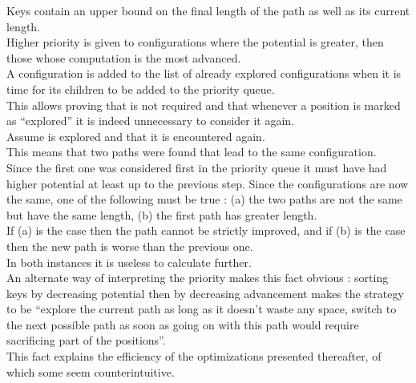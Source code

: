 Keys contain an upper bound on the final length of the path as well as its
current length.\\
Higher priority is given to configurations where the potential is greater, then
those whose computation is the most advanced.\\

A configuration  is added to the list
of already explored configurations when it is time for its children to be added
to the priority queue.\\
This allows proving that  is not required and that whenever a
position is marked as ``explored'' it is indeed unnecessary to consider it again.\\

Assume  is explored and that it is encountered again.\\
This means that two paths were found that lead to the same configuration.\\
Since the first one was considered first in the priority queue it must have
had higher potential at least up to the previous step. Since the configurations
are now the same, one of the following must be true :
(a) the two paths are not the same but have the same length,
(b) the first path has greater length.\\
If (a) is the case then the path cannot be strictly improved, and if (b) is the case
then the new path is worse than the previous one.\\
In both instances it is useless to calculate further.\\

An alternate way of interpreting the priority makes this fact obvious : sorting
keys by decreasing potential then by decreasing advancement makes the strategy to
be ``explore the current path as long as it doesn't waste any space, switch
to the next possible path as soon as going on with this path would require
sacrificing part of the positions''.\\
This fact explains the efficiency of the optimizations presented thereafter, of
which some seem counterintuitive.\\


